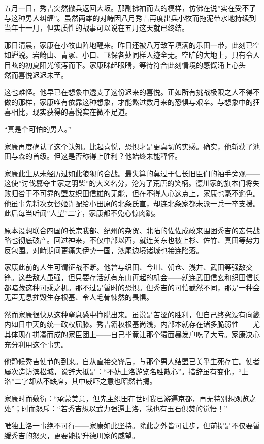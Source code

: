 \documentclass[
]{book}
\begin{document}
五月一日，秀吉突然撤兵返回大坂。那副拂袖而去的模样，仿佛在说''实在受不了与这种男人纠缠''。虽然两雄的对峙因八月秀吉再度出兵小牧而拖泥带水地持续到当年十一月，但实质性的战事可以说在五月这天就已终结。

那日清晨，家康在小牧山阵地醒来。昨日还被八万敌军填满的乐田一带，此刻已空如蝉蜕。岩崎山、青冢、小口、飞保各处同样人迹全无。空旷的大地上，只有令人目眩的初夏阳光倾泻而下。家康眯起眼睛，等待符合此刻情境的感慨涌上心头------然而喜悦迟迟未至。

这也难怪。他早已在想象中透支了这份迟来的喜悦。正如所有挑战极限之人不得不做的那样，家康唯有依靠这种想象，才能熬过数月来的恐惧与艰辛。与想象中的狂喜相比，现实获得的喜悦实在微不足道。

``真是个可怕的男人。''

家康再度确认了这个认知。比起喜悦，恐惧才是更真切的实感。确实，他斩获了池田与森的首级。但这是否称得上胜利？他始终未能释怀。

家康此生从未经历过如此狼狈的合战。最失算的莫过于信长旧臣们的袖手旁观------这使''讨伐篡夺主家之羽柴''的大义名分，沦为了荒唐的笑柄。德川家的旗本们将失败归咎于不可靠的盟友织田信雄的无能，但在不得人心这点上，家康也毫不逊色。他虽事先将次女督姬许配给小田原的北条氏直，却连北条家都未派一兵一卒支援。此后每当听闻''人望''二字，家康都不免心惊肉跳。

原本设想联合四国的长宗我部、纪州的杂贺、北陆的佐佐成政来围困秀吉的宏伟战略也彻底破产。回过神来，不仅中部以西，就连关东也被上杉、佐竹、真田等势力反包围。对峙期间更痛失伊势一国，浓尾边境诸城也接连陷落。

家康此前的人生可谓征战不断。他曾与织田、今川、朝仓、浅井、武田等强敌交锋。这些敌人虽强，但只要存活就有东山再起的机会------就连武田信玄和织田信长都暗藏这种可乘之机。那不过是暂时的恐惧。但秀吉的可怕截然不同，那是一种会无声无息摧毁生存根基、令人毛骨悚然的畏惧。

然而家康很快从这种窒息感中挣脱出来。虽说是苦涩的胜利，但自己终究没有向畿内如日中天的统一政权屈膝。秀吉霸权根基尚浅，内部本就存在诸多脆弱性------尤其体现在拼凑而成的家臣团上------自己毕竟让那个猿面暴发户吃了大亏。家康决心充分利用这个事实。

他静候秀吉使节的到来。自从直接交锋后，与那个男人结盟已关乎生死存亡。使者屡次造访滨松城，说辞大抵是：``不妨上洛游览名胜散心''。措辞虽有变化，``上洛''二字却从不缺席，其中威吓之意也昭然若揭。

家康时而敷衍：``承蒙美意，但先主织田在世时我已游遍京都，再无特别想观览之处''；时而怒斥：``若秀吉想以武力强逼上洛，我也有玉石俱焚的觉悟！''

唯独上洛一事绝不可行------家康如此坚持。除此之外皆可让步，但前提是不仅要暂缓秀吉的怒火，更要能提升德川家的威望。
\end{document}

